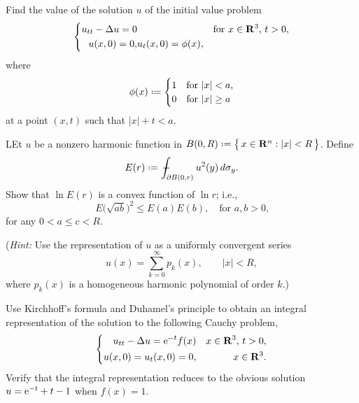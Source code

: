 \begin{problem}
  Find the value of the solution \(u\) of the initial value problem
  \[
    \left\{
      \begin{aligned}
        u_{tt}-\Lap u=0&&&\text{for \(x\in\R^3\), \(t>0\),}\\
        u(x,0)=0,&u_t(x,0)=\phi(x),
      \end{aligned}
    \right.
  \]
  where
  \[
    \phi(x)\defeq
    \begin{cases}
      1&\text{for \(|x|<a\),}\\
      0&\text{for \(|x|\geq a\)}
    \end{cases}
  \]
  at a point \((x,t)\) such that \(|x|+t<a\).
\end{problem}
\begin{solution*}
\end{solution*}

\begin{problem}
  LEt \(u\) be a nonzero harmonic function in
  \(B(0,R)\defeq\bigl\{\,x\in\R^n:|x|<R\,\bigr\}\). Define
  \[
    E(r)\defeq\fint_{\partial B(0,r)}u^2(y)\diff\sigma_y.
  \]
  Show that \(\ln E(r)\) is a convex function of \(\ln r\); i.e.,
  \[
    E\bigl(\sqrt{ab}\bigr)^2\leq E(a)E(b),\quad\text{for \(a,b>0\),}
  \]
  for any \(0<a\leq c<R\).

  \noindent (\emph{Hint:} Use the representation of \(u\) as a uniformly
  convergent series
  \[
    u(x)=\sum_{k=0}^\infty p_k(x),\qquad |x|<R,
  \]
  where \(p_k(x)\) is a homogeneous harmonic polynomial of order \(k\).)
\end{problem}
\begin{solution*}
\end{solution*}

\begin{problem}
  Use Kirchhoff's formula and Duhamel's principle to obtain an integral
  representation of the solution to the following Cauchy problem,
  \[
    \left\{
      \begin{aligned}
        u_{tt}-\Delta u=\mathrm{e}^{-t}f(x)&&\text{\(x\in\mathbf{R}^3\), \(t>0\),}\\
        u(x,0)=u_t(x,0)=0,&&x\in\mathbf{R}^3.
      \end{aligned}
    \right.
  \]
  Verify that the integral representation reduces to the obvious solution
  \(u=\mathrm{e}^{-t}+t-1\) when \(f(x)=1\).
\end{problem}
\begin{solution*}
\end{solution*}

